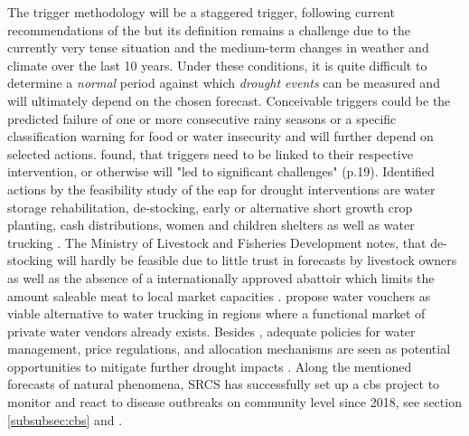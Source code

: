 The trigger methodology will be a staggered trigger, following current recommendations of the \textcite{rcrcForecastbasedFinancingEarly2020} but its definition remains a challenge due to the currently very tense situation and the medium-term changes in weather and climate over the last 10 years. Under these conditions, it is quite difficult to determine a \textit{normal} period against which \textit{drought events} can be measured and will ultimately depend on the chosen forecast. Conceivable triggers could be the predicted failure of one or more consecutive rainy seasons or a specific classification warning for food or water insecurity and will further depend on selected actions. \Textcite{gettliffeOCHAAnticipatoryAction2021} found, that triggers need to be linked to their respective intervention, or otherwise will "led to significant challenges" (p.19).\newline
Identified actions by the feasibility study of the \acrshort{eap} for drought interventions are water storage rehabilitation, de-stocking, early or alternative short growth crop planting, cash distributions, women and children shelters as well as water trucking \autocite{scrsFeasibilityStudyPotential2022}. The Ministry of Livestock and Fisheries Development notes, that de-stocking will hardly be feasible due to little trust in forecasts by livestock owners as well as the absence of a internationally approved abattoir which limits the amount saleable meat to local market capacities \autocite{scrsFeasibilityStudyPotential2022}. \Textcite{gualazziniEWEAEarlyWarning2021} propose water vouchers as viable alternative to water trucking in regions where a functional market of private water vendors already exists. Besides , adequate policies for water management, price regulations, and allocation mechanisms are seen as potential opportunities to mitigate further drought impacts \autocite{gualazziniEWEAEarlyWarning2021,wangPropagationDroughtMeteorological2016}.\newline
Along the mentioned forecasts of natural phenomena, SRCS has successfully set up a \acrshort{cbs} project to monitor and react to disease outbreaks on community level since 2018, see section \ref{subsubsec:cbs} and \textcite{jungCommunityBasedSurveillance2022}. 

